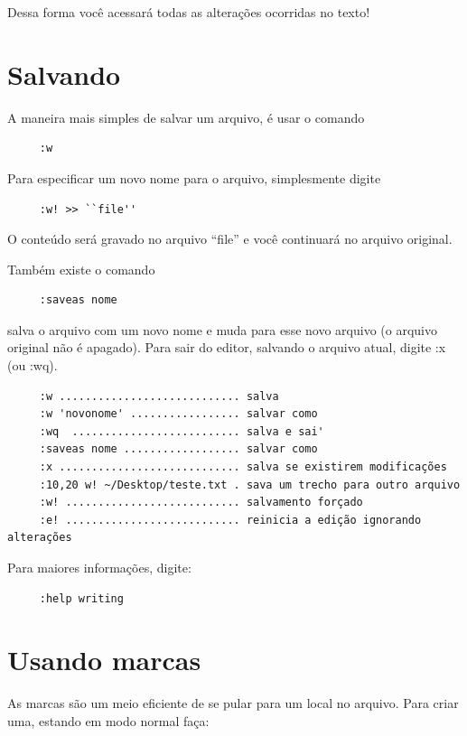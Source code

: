 \documentclass[10pt,a4paper,openany]{book}
\begin{document}
Dessa forma você acessará todas as alterações ocorridas no texto!

\section{Salvando}

A maneira mais simples de salvar um arquivo, é usar o comando

\begin{verbatim}
     :w
\end{verbatim}


Para especificar um novo nome para o arquivo, simplesmente digite

\begin{verbatim}
     :w! >> ``file''
\end{verbatim}

O conteúdo será gravado no arquivo ``file'' e você continuará no arquivo original.

Também existe o comando

\begin{verbatim}
     :saveas nome
\end{verbatim}

salva o arquivo com um novo nome e muda para esse novo arquivo (o arquivo original não é apagado).
Para sair do editor, salvando o arquivo atual, digite :x (ou :wq).

\begin{verbatim}
     :w ............................ salva
     :w 'novonome' ................. salvar como
     :wq  .......................... salva e sai'
     :saveas nome .................. salvar como
     :x ............................ salva se existirem modificações
     :10,20 w! ~/Desktop/teste.txt . sava um trecho para outro arquivo
     :w! ........................... salvamento forçado
     :e! ........................... reinicia a edição ignorando alterações
\end{verbatim}

Para maiores informações, digite:

\begin{verbatim}
     :help writing
\end{verbatim}

\section{Usando marcas}
\label{sec:Usando marcas}

As marcas são um meio eficiente de se pular para um local no arquivo. Para
criar uma,  estando em modo normal faça:
\end{document}
